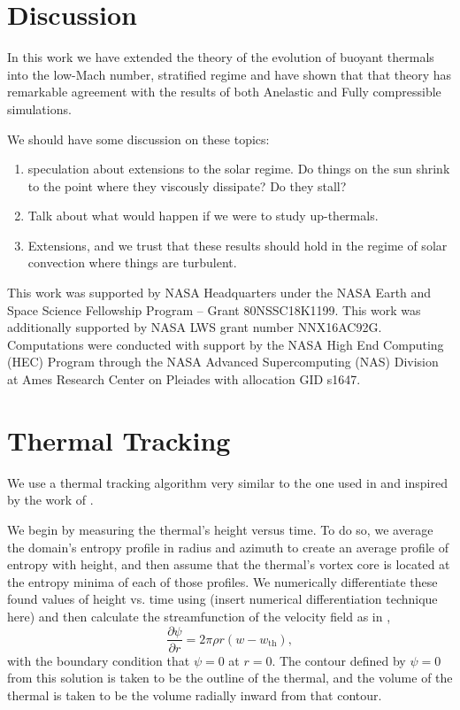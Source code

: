 \documentclass[twocolumn, amsmath, amsfonts, amssymb, trackchanges]{aastex62}
\begin{document}
\section{Discussion}
\label{sec:discussion}
In this work we have extended the theory of the evolution of buoyant thermals into the
low-Mach number, stratified regime and have shown that that theory has remarkable agreement
with the results of both Anelastic and Fully compressible simulations.

We should have some discussion on these topics:
\begin{enumerate}
\item speculation about extensions to the solar regime. Do things on the sun shrink
to the point where they viscously dissipate? Do they stall?
\item Talk about what would happen if we were to study up-thermals.
\item Extensions, and we trust that these results should hold in the regime of solar convection
where things are turbulent.
\end{enumerate}

\begin{acknowledgements}
This work was supported by NASA Headquarters under the NASA Earth and Space
Science Fellowship Program -- Grant 80NSSC18K1199.
This work was additionally supported by  NASA LWS grant number NNX16AC92G.  
Computations were conducted 
with support by the NASA High End Computing (HEC) Program through the NASA 
Advanced Supercomputing (NAS) Division at Ames Research Center on Pleiades
with allocation GID s1647.
\end{acknowledgements}

\appendix
\section{Thermal Tracking}
\label{appendix:tracking}
We use a thermal tracking algorithm very similar to the one used in 
\citet{lecoanet&jeevanjee2018} and inspired by the work of 
\citet{romps&all2015}. 

We begin by measuring the thermal's height versus
time. To do so, we average the domain's entropy profile in radius and azimuth
to create an average profile of entropy with height, and then assume that the
thermal's vortex core is located at the entropy minima of each of those profiles.
We numerically differentiate these found values of height vs. time using
(insert numerical differentiation technique here) and then calculate the streamfunction of
the velocity field as in \citet{romps&all2015},
\begin{equation}
\frac{\partial \psi}{\partial r} = 2\pi \rho r (w - w_{\text{th}}),
\end{equation}
with the boundary condition that $\psi = 0$ at $r = 0$. The contour defined by $\psi = 0$
from this solution is taken to be the outline of the thermal, and the volume of the thermal
is taken to be the volume radially inward from that contour.
\end{document}
